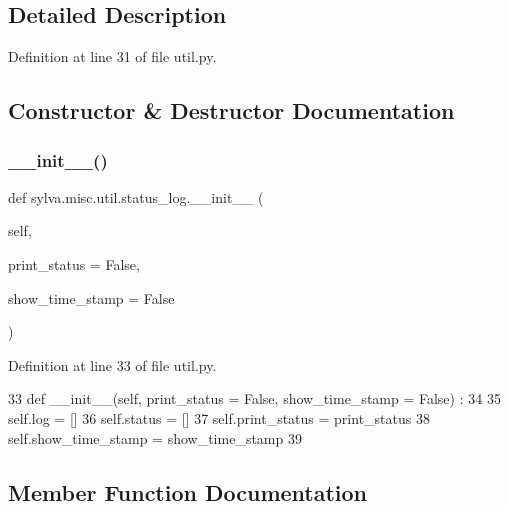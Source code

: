 \subsection{Detailed Description}


Definition at line 31 of file util.\+py.



\subsection{Constructor \& Destructor Documentation}
\mbox{\label{classsylva_1_1misc_1_1util_1_1status__log_ab7c946f90680f9a4460404cf7c64f126}} 
\subsubsection{\texorpdfstring{\+\_\+\+\_\+init\+\_\+\+\_\+()}{\_\_init\_\_()}}
{\footnotesize\ttfamily def sylva.\+misc.\+util.\+status\+\_\+log.\+\_\+\+\_\+init\+\_\+\+\_\+ (\begin{DoxyParamCaption}\item[{}]{self,  }\item[{}]{print\+\_\+status = {\ttfamily False},  }\item[{}]{show\+\_\+time\+\_\+stamp = {\ttfamily False} }\end{DoxyParamCaption})}



Definition at line 33 of file util.\+py.


\begin{DoxyCode}
33   \textcolor{keyword}{def }\_\_init\_\_(self, print\_status = False, show\_time\_stamp = False) :
34 
35     self.log = []
36     self.status = []
37     self.print\_status = print\_status
38     self.show\_time\_stamp = show\_time\_stamp
39 
\end{DoxyCode}


\subsection{Member Function Documentation}
\mbox{\label{classsylva_1_1misc_1_1util_1_1status__log_ab98f2dd8f3108204d97d0415ab838f96}} 
